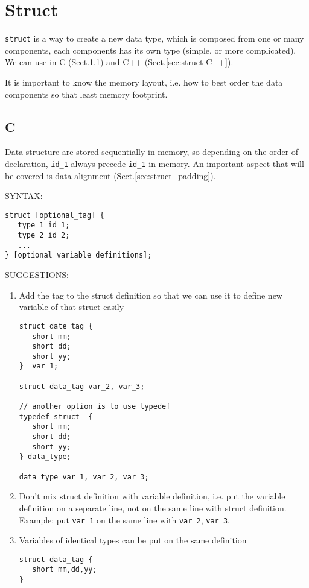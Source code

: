 \section{Struct}
\label{sec:struct}

\verb!struct! is a way to create a new data type, which is composed from one or
many components, each components has its own type (simple, or more complicated).
We can use in C (Sect.\ref{sec:struct-C}) and C++ (Sect.\ref{sec:struct-C++}).

It is important to know the memory layout, i.e. how to best order the data components so that least memory footprint.

\subsection{C}
\label{sec:struct-C}

Data structure are stored sequentially in memory, so depending on the order of
declaration, \verb!id_1! always precede \verb!id_1! in memory. An important
aspect that will be covered is data alignment (Sect.\ref{sec:struct_padding}). 

SYNTAX:
\begin{verbatim}
struct [optional_tag] {
   type_1 id_1;
   type_2 id_2;
   ...
} [optional_variable_definitions]; 
\end{verbatim}

SUGGESTIONS:
\begin{enumerate}
  \item Add the tag to the struct definition so that we can use it to define new
  variable of that struct easily
\begin{Verbatim}
struct date_tag { 
   short mm;
   short dd;
   short yy;
}  var_1;

struct data_tag var_2, var_3;

// another option is to use typedef
typedef struct  { 
   short mm;
   short dd;
   short yy;
} data_type;

data_type var_1, var_2, var_3; 
\end{Verbatim}

  \item Don't mix struct definition with variable definition, i.e. put the
  variable definition on a separate line, not on the same line with struct
  definition. Example: put \verb!var_1! on the same line with \verb!var_2!,
  \verb!var_3!.
  
  \item Variables of identical types can be put on the same definition
\begin{verbatim}
struct data_tag {
   short mm,dd,yy;
}
\end{verbatim}
\end{enumerate}

